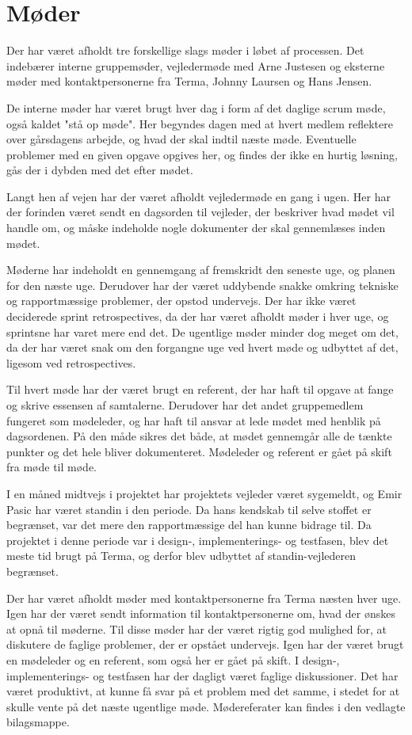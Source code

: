 \chapter{Møder}
Der har været afholdt tre forskellige slags møder i løbet af processen. Det indebærer interne gruppemøder, vejledermøde med Arne Justesen og eksterne møder med kontaktpersonerne fra Terma, Johnny Laursen og Hans Jensen.  

De interne møder har været brugt hver dag i form af det daglige scrum møde, også kaldet "stå op møde". Her begyndes dagen med at hvert medlem reflektere over gårsdagens arbejde, og hvad der skal indtil næste møde. Eventuelle problemer med en given opgave opgives her, og findes der ikke en hurtig løsning, gås der i dybden med det efter mødet. 

Langt hen af vejen har der været afholdt vejledermøde en gang i ugen. Her har der forinden været sendt en dagsorden til vejleder, der beskriver hvad mødet vil handle om, og måske indeholde nogle dokumenter der skal gennemlæses inden mødet. 

Møderne har indeholdt en gennemgang af fremskridt den seneste uge, og planen for den næste uge. Derudover har der været uddybende snakke omkring tekniske og rapportmæssige problemer, der opstod undervejs. Der har ikke været deciderede sprint retrospectives, da der har været afholdt møder i hver uge, og sprintsne har varet mere end det. De ugentlige møder minder dog meget om det, da der har været snak om den forgangne uge ved hvert møde og udbyttet af det, ligesom ved retrospectives. 

Til hvert møde har der været brugt en referent, der har haft til opgave at fange og skrive essensen af samtalerne. Derudover har det andet gruppemedlem fungeret som mødeleder, og har haft til ansvar at lede mødet med henblik på dagsordenen. På den måde sikres det både, at mødet gennemgår alle de tænkte punkter og det hele bliver dokumenteret. Mødeleder og referent er gået på skift fra møde til møde.    

I en måned midtvejs i projektet har projektets vejleder været sygemeldt, og Emir Pasic har været standin i den periode. Da hans kendskab til selve stoffet er begrænset, var det mere den rapportmæssige del han kunne bidrage til. Da projektet i denne periode var i design-, implementerings- og testfasen, blev det meste tid brugt på Terma, og derfor blev udbyttet af standin-vejlederen begrænset.      

Der har været afholdt møder med kontaktpersonerne fra Terma næsten hver uge. Igen har der været sendt information til kontaktpersonerne om, hvad der ønskes at opnå til møderne. Til disse møder har der været rigtig god mulighed for, at diskutere de faglige problemer, der er opstået undervejs. Igen har der været brugt en mødeleder og en referent, som også her er gået på skift.  
I design-, implementerings- og testfasen har der dagligt været faglige diskussioner. Det har været produktivt, at kunne få svar på et problem med det samme, i stedet for at skulle vente på det næste ugentlige møde. Mødereferater kan findes i den vedlagte bilagsmappe. 